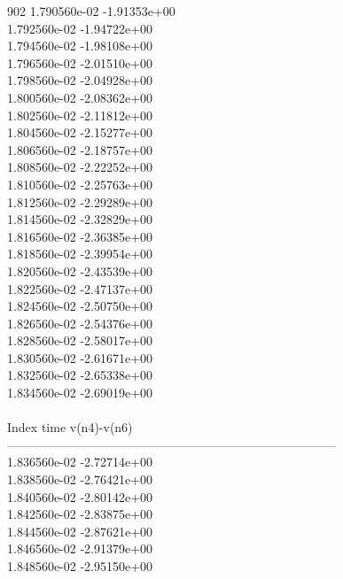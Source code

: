 902	1.790560e-02	-1.91353e+00	\\ 	1.792560e-02	-1.94722e+00	\\ 	1.794560e-02	-1.98108e+00	\\ 	1.796560e-02	-2.01510e+00	\\ 	1.798560e-02	-2.04928e+00	\\ 	1.800560e-02	-2.08362e+00	\\ 	1.802560e-02	-2.11812e+00	\\ 	1.804560e-02	-2.15277e+00	\\ 	1.806560e-02	-2.18757e+00	\\ 	1.808560e-02	-2.22252e+00	\\ 	1.810560e-02	-2.25763e+00	\\ 	1.812560e-02	-2.29289e+00	\\ 	1.814560e-02	-2.32829e+00	\\ 	1.816560e-02	-2.36385e+00	\\ 	1.818560e-02	-2.39954e+00	\\ 	1.820560e-02	-2.43539e+00	\\ 	1.822560e-02	-2.47137e+00	\\ 	1.824560e-02	-2.50750e+00	\\ 	1.826560e-02	-2.54376e+00	\\ 	1.828560e-02	-2.58017e+00	\\ 	1.830560e-02	-2.61671e+00	\\ 	1.832560e-02	-2.65338e+00	\\ 	1.834560e-02	-2.69019e+00	\\ \hline
\\ \hline
Index   time            v(n4)-v(n6)     \\ \hline
--------------------------------------------------------------------------------\\ 	1.836560e-02	-2.72714e+00	\\ 	1.838560e-02	-2.76421e+00	\\ 	1.840560e-02	-2.80142e+00	\\ 	1.842560e-02	-2.83875e+00	\\ 	1.844560e-02	-2.87621e+00	\\ 	1.846560e-02	-2.91379e+00	\\ 	1.848560e-02	-2.95150e+00	\\ \hline
